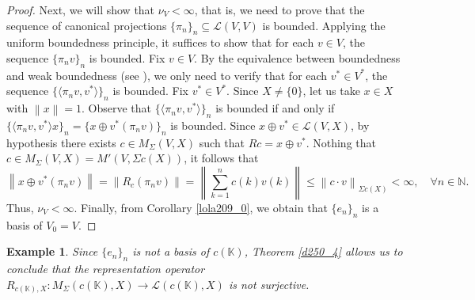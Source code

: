 \documentclass[14pt, a4paper]{article}  %
\providecommand{\norm}[1]{\left\lVert#1\right\rVert}
\newcommand{\K}{\mathbb{K}}
\newcommand{\N}{\mathbb{N}}
\newtheorem{example}{Example}[section]  %
\begin{document}
\begin{proof}
	Next, we will show that $\nu_{V} < \infty$, that is, we need to prove that the sequence of canonical projections $\{\pi_{n}\}_{n} \subseteq \mathcal{L}(V, V)$ is bounded. Applying the uniform boundedness principle, it suffices to show that for each $v \in V$, the sequence $\{\pi_{n}v\}_{n}$ is bounded. Fix $v \in V$. By the equivalence between boundedness and weak boundedness (see \cite[Thm. 3.18]{R}), we only need to verify that for each $v^{*} \in V^{*}$, the sequence $\{\langle \pi_{n}v, v^{*} \rangle\}_{n}$ is bounded. Fix $v^{*} \in V^{*}$. Since $X \neq \{0\}$, let us take $x \in X$ with $\norm{x}=1$. Observe that $\{\langle \pi_{n}v, v^{*} \rangle\}_{n}$ is bounded if and only if $\{\langle \pi_{n}v, v^{*}\rangle x\}_{n} = \{x \oplus v^{*} (\pi_{n}v)\}_{n}$ is bounded. Since $x \oplus v^{*} \in \mathcal{L}(V, X)$, by hypothesis there exists $c \in M_{\Sigma}(V, X)$ such that $Rc = x \oplus v^{*}$. Nothing that $c \in M_{\Sigma}(V, X) = M'(V, \Sigma c(X))$, it follows that 
	\begin{equation}
		\norm{x \oplus v^{*}(\pi_{n}v)} = \norm{R_{c}(\pi_{n}v)} = \norm{\sum_{k=1}^{n} c(k) v(k)} \leq \norm{c \cdot v}_{\Sigma c(X)} < \infty, \quad \forall n \in \N.
	\end{equation}
	Thus, $\nu_{V} < \infty$. Finally, from Corollary \ref{lola209_0}, we obtain that $\{e_{n}\}_{n}$ is a basis of $V_{0} = V$.   
\end{proof}









  

\begin{example}
	Since $\{e_{n}\}_{n}$ is not a basis of $c(\K)$, Theorem \ref{d250_4} allows us to conclude that the representation operator $R_{c(\K), X}: M_{\Sigma}(c(\K), X) \to \mathcal{L}(c(\K), X)$ is not surjective. 
\end{example}

 
\end{document}
